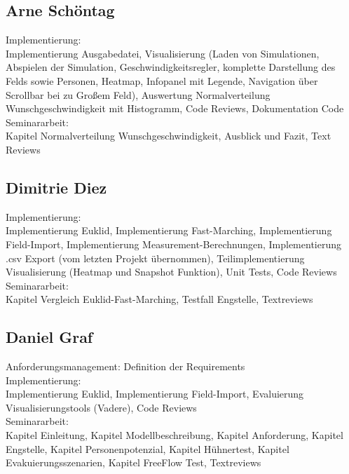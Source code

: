 \subsection{Arne Schöntag}
Implementierung:\\
Implementierung Ausgabedatei, Visualisierung (Laden von Simulationen, Abspielen der Simulation, Geschwindigkeitsregler, komplette Darstellung des Felds sowie Personen, Heatmap, Infopanel mit Legende, Navigation über Scrollbar bei zu Großem Feld), Auswertung Normalverteilung Wunschgeschwindigkeit mit Histogramm, Code Reviews, Dokumentation Code \\
Seminararbeit:\\
Kapitel Normalverteilung Wunschgeschwindigkeit, Ausblick und Fazit, Text Reviews

\subsection{Dimitrie Diez}
Implementierung:\\
Implementierung Euklid, Implementierung Fast-Marching, Implementierung Field-Import, Implementierung Measurement-Berechnungen, Implementierung .csv Export (vom letzten Projekt übernommen), Teilimplementierung Visualisierung (Heatmap und Snapshot Funktion), Unit Tests, Code Reviews\\
Seminararbeit:\\
Kapitel Vergleich Euklid-Fast-Marching, Testfall Engstelle, Textreviews

\subsection{Daniel Graf}
Anforderungsmanagement: Definition der Requirements \\
Implementierung:\\
Implementierung Euklid, Implementierung Field-Import, Evaluierung Visualisierungstools (Vadere), Code Reviews \\
Seminararbeit:\\
Kapitel Einleitung, Kapitel Modellbeschreibung, Kapitel Anforderung, Kapitel Engstelle, Kapitel Personenpotenzial, Kapitel Hühnertest, Kapitel Evakuierungsszenarien, Kapitel FreeFlow Test, Textreviews

\newpage
%




